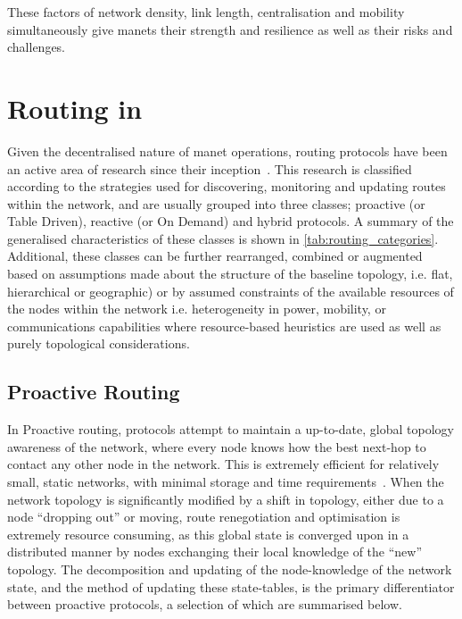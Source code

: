 These factors of network density, link length, centralisation and mobility simultaneously give \glspl{manet} their strength and resilience as well as their risks and challenges.


\section{Routing in }\label{sec:manet_routing}

{\titlespacing{\subsubsection}{0pt}{\parskip}{\parskip}
	
Given the decentralised nature of \gls{manet} operations, routing protocols have been an active area of research since their inception~\cite{Jubin1987}.
This research is classified according to the strategies used for discovering, monitoring and updating routes within the network, and are usually grouped into three classes; proactive (or Table Driven), reactive (or On Demand) and hybrid protocols.
A summary of the generalised characteristics of these classes is shown in \autoref{tab:routing_categories}.
Additional, these classes can be further rearranged, combined or augmented based on assumptions made about the structure of the baseline topology, i.e. flat, hierarchical or geographic) or by assumed constraints of the available resources of the nodes within the network i.e. heterogeneity in power, mobility, or communications capabilities where resource-based heuristics are used as well as purely topological considerations\cite{Li2005,Gerla2002}.

\subsection{Proactive Routing}

In Proactive routing, protocols attempt to maintain a up-to-date, global topology awareness of the network, where every node knows how the best next-hop to contact any other node in the network.
This is extremely efficient for relatively small, static networks, with minimal storage and time requirements~\cite{Mbarushimana2007}.
When the network topology is significantly modified by a shift in topology, either due to a node ``dropping out'' or moving, route renegotiation and optimisation is extremely resource consuming, as this global state is converged upon in a distributed manner by nodes exchanging their local knowledge of the ``new'' topology.
The decomposition and updating of the node-knowledge of the network state, and the method of updating these state-tables, is the primary differentiator between proactive protocols, a selection of which are summarised below.

}
